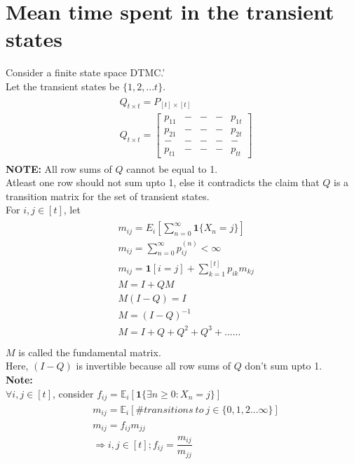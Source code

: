 \documentclass[a4paper,10pt]{article}
\theoremstyle{plain}
\theoremstyle{definition}
\theoremstyle{remark}
\begin{document}
\section{Mean time spent in the transient states}
Consider a finite state space DTMC.'\\
Let the transient states be $\{1,2,...t\}$.\\
\begin{eqnarray*}
	\begin{aligned}
	&	Q_{t \times t} = P_{[t] \times [t]}\\
	&	Q_{t \times t} = \begin{bmatrix} p_{11}&-&-&-&p_{1t}\\ p_{21}&-&-&-&p_{2t} \\ -&-&-&-&-\\ p_{t1}&-&-&-&p_{tt} \end{bmatrix}
    \end{aligned}
\end{eqnarray*}
\textbf{NOTE:} All row sums of $Q$ cannot be equal to 1.\\
Atleast one row should not sum upto 1, else it contradicts the claim that $Q$ is a transition matrix for the set of transient states.\\
For $i,j \in [t]$, let\\
\begin{eqnarray*}
	\begin{aligned}
& m_{ij} = E_i[\sum_{n=0}^{\infty} \textbf{1} \{X_n = j\}]\\
& m_{ij} = \sum_{n=0}^{\infty} p_{ij}^{(n)} < \infty\\
& m_{ij} = \textbf{1}[i = j] + \sum_{k=1}^{[t]} p_{ik}m_{kj} \\
& M = I + QM\\
& M(I - Q) = I\\
& M = (I - Q)^{-1}\\
& M = I + Q + Q^{2} + Q^{3} + ......\\
    \end{aligned}
\end{eqnarray*}
$M$ is called the fundamental matrix.\\
Here, $(I - Q)$ is invertible because all row sums of $Q$ don't sum upto 1.\\
\textbf{Note:}\\
$\forall i,j \in [t]$, consider $f_{ij} = \mathbb{E}_i[\textbf{1} \{\exists n \geq 0: X_n = j \}]$\\
\begin{eqnarray*}
\begin{aligned}
& m_{ij} = \mathbb{E}_i[\# transitions\ to\ j \in \{0,1,2...\infty\}]\\
& m_{ij} = f_{ij} m_{jj}\\
&\Rightarrow i,j \in [t]; f_{ij} = \dfrac{m_{ij}}{m_{jj}}
\end{aligned}
\end{eqnarray*}
 
\end{document}
